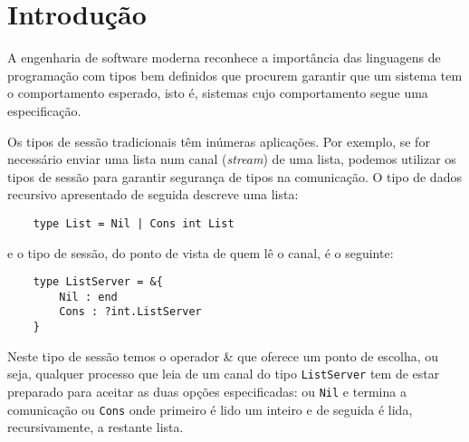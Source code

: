 
\section{Introdução}
\label{sec:intro}

A engenharia de software moderna reconhece a importância das linguagens de programação com tipos bem definidos que procurem garantir que um sistema tem o comportamento esperado, isto é, sistemas cujo comportamento segue uma especificação.



Os tipos de sessão tradicionais têm inúmeras aplicações. Por exemplo, se for necessário enviar uma lista num canal (\textit{stream}) de uma lista, podemos utilizar os tipos de sessão para garantir segurança de tipos na comunicação. O tipo de dados recursivo apresentado de seguida descreve uma lista:
\begin{lstlisting}
	type List = Nil | Cons int List
\end{lstlisting}
e o tipo de sessão, do ponto de vista de quem lê o canal, é o seguinte:
\begin{lstlisting}
	type ListServer = &{
		Nil : end
		Cons : ?int.ListServer
	}
\end{lstlisting}

Neste tipo de sessão temos o operador \& que oferece um ponto de escolha, ou seja, qualquer processo que leia de um canal do tipo \lstinline"ListServer" tem de estar preparado para aceitar as duas opções especificadas: ou \lstinline"Nil" e termina a comunicação ou \lstinline"Cons" onde primeiro é lido um inteiro e de seguida é lida, recursivamente, a restante lista.

